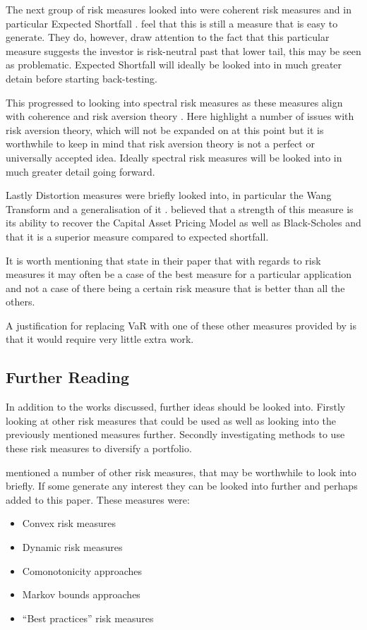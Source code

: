 \documentclass[12pt,a4paper]{article}
\newcommand{\bi}{\begin{itemize}}
\newcommand{\ei}{\end{itemize}}
\begin{document}
The next group of risk measures looked into were coherent risk measures and in particular Expected Shortfall \citep{ACERBI20021505}. \cite{dowd2006after} feel that this is still a measure that is easy to generate. They do, however, draw attention to the fact that this particular measure suggests the investor is risk-neutral past that lower tail, this may be seen as problematic. Expected Shortfall will ideally be looked into in much greater detain before starting back-testing.

This progressed to looking into spectral risk measures as these measures align with coherence and risk aversion theory \citep{dowd2006after}. Here \cite{dowd2006after} highlight a number of issues with risk aversion theory, which will not be expanded on at this point but it is worthwhile to keep in mind that risk aversion theory is not a perfect or universally accepted idea. Ideally spectral risk measures will be looked into in much greater detail going forward.

Lastly Distortion measures were briefly looked into, in particular the Wang Transform and a generalisation of it  \citep{dowd2006after}. \cite{dowd2006after} believed that a strength of this measure is its ability to recover the Capital Asset Pricing Model as well as Black-Scholes and that it is a superior measure compared to expected shortfall.
 
It is worth mentioning that \cite{dowd2006after} state in their paper that with regards to risk measures it may often be a case of the best measure for a particular application and not a case of there being a certain risk measure that is better than all the others. 

A justification for replacing VaR with one of these other measures provided by \cite{dowd2006after} is that it would require very little extra work. 

\subsection{Further Reading}
\label{subsec:FurRead}

In addition to the works discussed, further ideas should be looked into. Firstly looking at other risk measures that could be used as well as looking into the previously mentioned measures further. Secondly investigating methods to use these risk measures to diversify a portfolio. 

\cite{dowd2006after} mentioned a number of other risk measures, that may be worthwhile to look into briefly. If some generate any interest they can be looked into further and perhaps added to this paper. These measures were:
\bi
\item Convex risk measures
\item Dynamic risk measures
\item Comonotonicity approaches
\item Markov bounds approaches
\item “Best practices” risk measures
\ei
 
\end{document}
